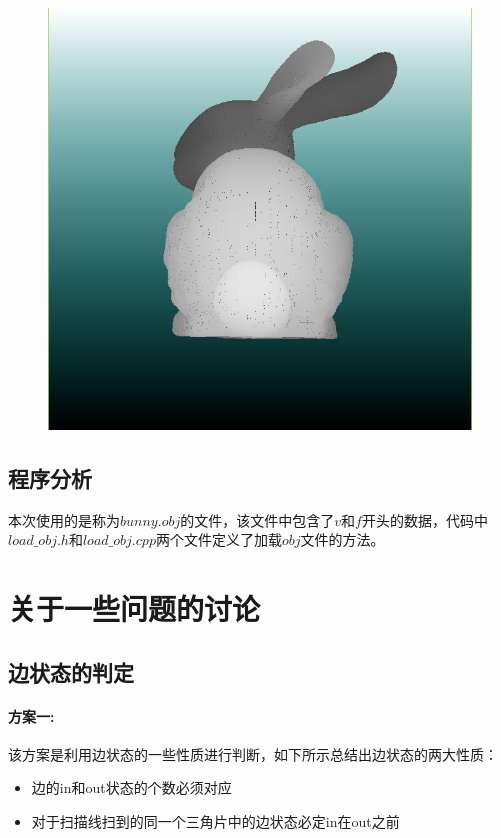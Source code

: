 \documentclass[10pt]{article}
\begin{document}
\begin{figure}[H]
\begin{center}
\includegraphics[scale=0.5]{bunny.png}
\end{center}
\end{figure}
\subsection{程序分析}
本次使用的是称为$bunny.obj$的文件，该文件中包含了$v$和$f$开头的数据，代码中$load\_obj.h$和$load\_obj.cpp$两个文件定义了加载$obj$文件的方法。

\section{关于一些问题的讨论}
\subsection{边状态的判定}
\paragraph{方案一:}
该方案是利用边状态的一些性质进行判断，如下所示总结出边状态的两大性质：
\begin{itemize}
\item{边的in和out状态的个数必须对应}
\item{对于扫描线扫到的同一个三角片中的边状态必定in在out之前}
\end{itemize}
\end{document}
